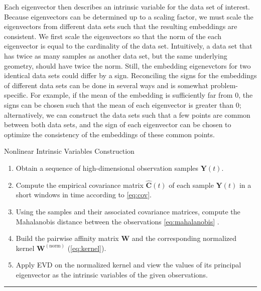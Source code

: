 \documentclass[aip,jcp,preprint]{revtex4-1}
\begin{document}
Each eigenvector then describes an intrinsic variable for the data set of interest.
%
Because eigenvectors can be determined up to a scaling factor, we must scale the eigenvectors from different data sets such that the resulting embeddings are consistent.
%
We first scale the eigenvectors so that the norm of the each eigenvector is equal to the cardinality of the data set.
%
Intuitively, a data set that has twice as many samples as another data set, but the same underlying geometry, should have twice the norm.
%
Still, the embedding eigenevctors for two identical data sets could differ by a sign.
%
Reconciling the signs for the embeddings of different data sets can be done in several ways and is somewhat problem-specific.
%
For example, if the mean of the embedding is sufficiently far from 0, the signs can be chosen such that the mean of each eigenvector is greater than 0;
alternatively, we can construct the data sets such that a few points are common between both data sets, and the sign of each eigenvector can be chosen to optimize the consistency of the embeddings of these common points.

\begin{algorithm}[th!]
\caption{Nonlinear Intrinsic Variables Construction}
\begin{enumerate}

\item
Obtain a sequence of high-dimensional observation samples $\mathbf{Y}(t)$.

\item
Compute the empirical covariance matrix $\widehat{\mathbf{C}}(t)$ of each sample $\mathbf{Y}(t)$ in a short windows in time according to \eqref{eq:cov}.

\item
Using the samples and their associated covariance matrices, compute the Mahalanobis distance between the observations \eqref{eq:mahalanobis} .

\item
Build the pairwise affinity matrix $\mathbf{W}$ and the corresponding normalized kernel $\mathbf{W}^{(\mathrm{norm})}$ (\ref{eq:kernel}).

\item
Apply EVD on the normalized kernel and view the values of its principal eigenvector as the intrinsic variables of the given observations.

\end{enumerate}
\hrule
\label{algo}
\end{algorithm}
\end{document}
